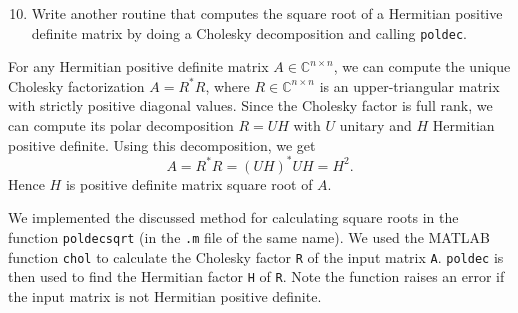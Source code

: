 \documentclass[10pt, A4paper]{article}
\newcommand{\nxn}{n \times n}
\begin{document}
\vspace{0.2cm}
\begin{enumerate}
	\setcounter{enumi}{9}
	\item Write another routine that computes the square root of a 
	Hermitian positive definite matrix by doing a Cholesky 
	decomposition and calling \texttt{poldec}.
\end{enumerate}

For any Hermitian positive definite matrix $A \in \mathbb{C}^{\nxn}$, 
we can compute the unique Cholesky factorization $A = R^*R$, where $R 
\in \mathbb{C}^{\nxn}$ is an upper-triangular matrix with strictly 
positive diagonal values.
Since the Cholesky factor is full rank, we can compute its polar 
decomposition $R = UH$ with $U$ unitary and $H$ Hermitian positive 
definite.
Using this decomposition, we get $$A = R^*R = (UH)^*UH = H^2.$$
Hence $H$ is positive definite matrix square root of $A$.

We implemented the discussed method for calculating square roots in the 
function \texttt{poldecsqrt} (in the \texttt{.m} file of the same name).
We used the MATLAB function \texttt{chol} to calculate the Cholesky 
factor \texttt{R} of the input matrix \texttt{A}.
\texttt{poldec} is then used to find the Hermitian factor \texttt{H} of 
\texttt{R}. Note the function raises an error if the input matrix is 
not Hermitian positive definite.




\end{document}
